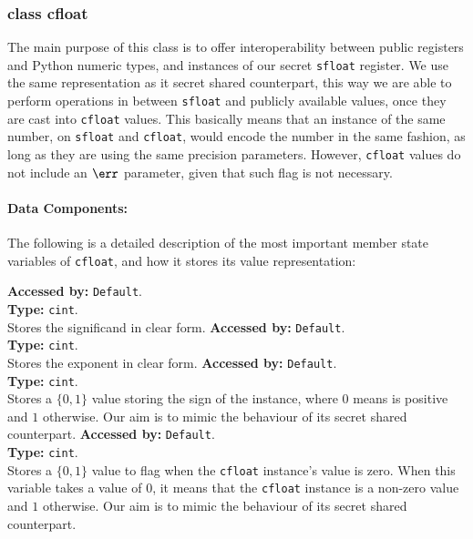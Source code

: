 \subsubsection{class cfloat}
The main purpose of this class is to offer interoperability between public registers 
and Python numeric types, and instances of our secret \verb|sfloat| register. 
We use the same representation as it secret shared counterpart, 
this way we are able to perform operations in between \verb|sfloat| and publicly available values, 
once they are cast into \verb|cfloat| values.
This basically means that an instance of the same number, on \verb|sfloat| and \verb|cfloat|, 
would  encode the number in the same fashion, 
as long as they are using the same precision parameters. 
However, \verb|cfloat| values do not include an $\err$ parameter, 
given that such flag is not necessary.

\paragraph{Data Components:}
		The following is a detailed description of the most important member state variables of \verb|cfloat|, and how it stores its value representation:
		
		\textbf{Accessed by:} \verb|Default|.\\
		\textbf{Type:} \verb|cint|.\\
		Stores the significand in clear form.
		\textbf{Accessed by:} \verb|Default|.\\
		\textbf{Type:} \verb|cint|.\\
		Stores the  exponent in clear form.
		\textbf{Accessed by:} \verb|Default|.\\
		\textbf{Type:} \verb|cint|.\\
		Stores a $\{0,1\}$ value storing the sign of the instance, 
		where $0$ means is positive and $1$ otherwise. 
		Our aim is to mimic the behaviour of its secret shared counterpart.
		\textbf{Accessed by:} \verb|Default|.\\
		\textbf{Type:} \verb|cint|.\\
		Stores a $\{0,1\}$ value to flag when the \verb|cfloat| 
		instance's value is zero. 
		When this variable takes a value of $0$, it means that the \verb|cfloat| 
		instance is a non-zero value and $1$ otherwise. 
		Our aim is to mimic the behaviour of its secret shared counterpart.

